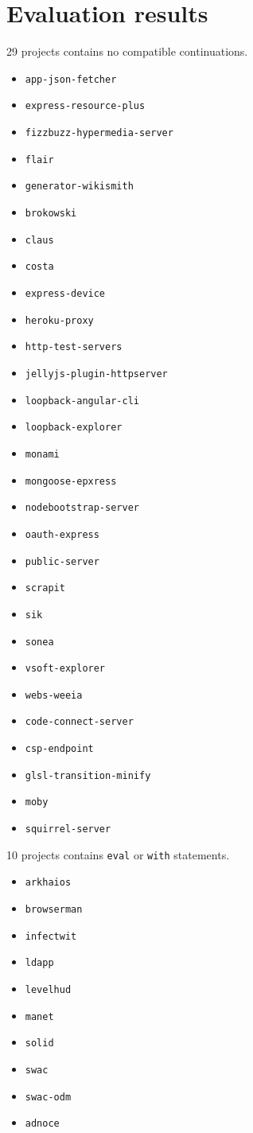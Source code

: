 \appendix

\section{Evaluation results} \label{section:results}

29 projects contains no compatible continuations.
\begin{itemize}
\item \texttt{app-json-fetcher}
\item \texttt{express-resource-plus}
\item \texttt{fizzbuzz-hypermedia-server}
\item \texttt{flair}
\item \texttt{generator-wikismith}
\item \texttt{brokowski}
\item \texttt{claus}
\item \texttt{costa}
\item \texttt{express-device}
\item \texttt{heroku-proxy}
\item \texttt{http-test-servers}
\item \texttt{jellyjs-plugin-httpserver}
\item \texttt{loopback-angular-cli}
\item \texttt{loopback-explorer}
\item \texttt{monami}
\item \texttt{mongoose-epxress}
\item \texttt{nodebootstrap-server}
\item \texttt{oauth-express}
\item \texttt{public-server}
\item \texttt{scrapit}
\item \texttt{sik}
\item \texttt{sonea}
\item \texttt{vsoft-explorer}
\item \texttt{webs-weeia}
\item \texttt{code-connect-server}
\item \texttt{csp-endpoint}
\item \texttt{glsl-transition-minify}
\item \texttt{moby}
\item \texttt{squirrel-server}
\end{itemize}

10 projects contains \texttt{eval} or \texttt{with} statements.
\begin{itemize}
\item \texttt{arkhaios}
\item \texttt{browserman}
\item \texttt{infectwit}
\item \texttt{ldapp}
\item \texttt{levelhud}
\item \texttt{manet}
\item \texttt{solid}
\item \texttt{swac}
\item \texttt{swac-odm}
\item \texttt{adnoce}
\end{itemize}

